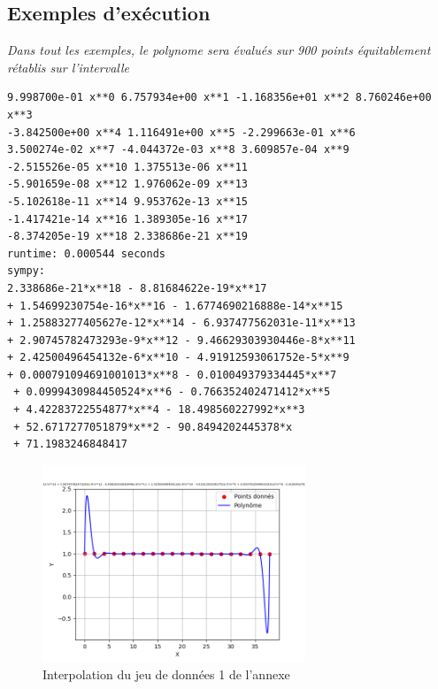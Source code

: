 \subsection{Exemples d'exécution}
\textit{Dans tout les exemples, le polynome sera évalués sur 900 points équitablement rétablis sur l'intervalle}
\begin{lstlisting}[caption=res41.err, basicstyle=\fontsize{8}{10}\selectfont]
9.998700e-01 x**0 6.757934e+00 x**1 -1.168356e+01 x**2 8.760246e+00 x**3
-3.842500e+00 x**4 1.116491e+00 x**5 -2.299663e-01 x**6 
3.500274e-02 x**7 -4.044372e-03 x**8 3.609857e-04 x**9 
-2.515526e-05 x**10 1.375513e-06 x**11 
-5.901659e-08 x**12 1.976062e-09 x**13 
-5.102618e-11 x**14 9.953762e-13 x**15 
-1.417421e-14 x**16 1.389305e-16 x**17 
-8.374205e-19 x**18 2.338686e-21 x**19 
runtime: 0.000544 seconds
sympy: 
2.338686e-21*x**18 - 8.81684622e-19*x**17 
+ 1.54699230754e-16*x**16 - 1.6774690216888e-14*x**15 
+ 1.25883277405627e-12*x**14 - 6.937477562031e-11*x**13 
+ 2.90745782473293e-9*x**12 - 9.46629303930446e-8*x**11 
+ 2.42500496454132e-6*x**10 - 4.91912593061752e-5*x**9 
+ 0.000791094691001013*x**8 - 0.010049379334445*x**7
 + 0.0999430984450524*x**6 - 0.766352402471412*x**5 
 + 4.42283722554877*x**4 - 18.498560227992*x**3 
 + 52.6717277051879*x**2 - 90.8494202445378*x 
 + 71.1983246848417
\end{lstlisting}
\begin{figure}[h]
    \centering
    \includegraphics[width=0.7\textwidth]{sources/max/res41.-fig.png}
    \caption{Interpolation du jeu de données 1 de l'annexe}
\end{figure}
\newpage
